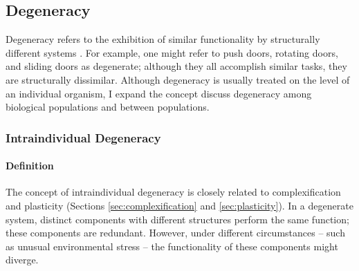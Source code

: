 \subsection{Degeneracy} \label{sec:degeneracy}

Degeneracy refers to the exhibition of similar functionality by structurally different systems  \cite{Edelman2001DegeneracySystems}. For example, one might refer to push doors, rotating doors, and sliding doors as degenerate; although they all accomplish similar tasks, they are structurally dissimilar. Although degeneracy is usually treated on the level of an individual organism, I expand the concept discuss degeneracy among biological populations and between populations.

\subsubsection{Intraindividual Degeneracy}

\paragraph{Definition}
The concept of intraindividual degeneracy is closely related to complexification and plasticity (Sections \ref{sec:complexification} and \ref{sec:plasticity}). In a degenerate system, distinct components with different structures perform the same function; these components are redundant. However, under different circumstances -- such as unusual environmental stress -- the functionality of these components might diverge. \cite{Richter2015EvolvabilitySurvey}

